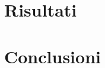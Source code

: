 \documentclass[]{IEEEtran}
\begin{document}
\section{Risultati}
	\label{risultati}
	
	
\section{Conclusioni}
\label{conclusioni}
		





\end{document}
